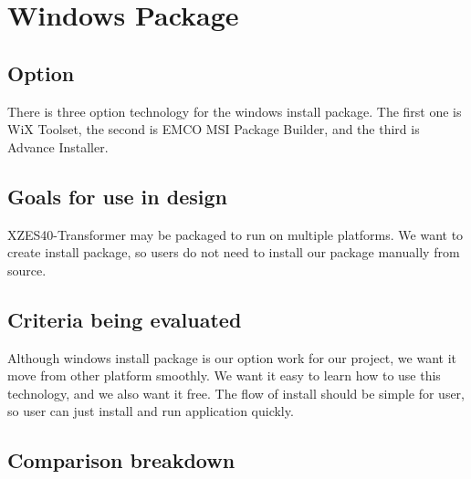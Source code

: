 \section{Windows Package}

\subsection{Option}

There is three option technology for the windows install package.
The first one is WiX Toolset, the second is EMCO MSI Package Builder, and the third is Advance Installer.

\subsection{Goals for use in design}

XZES40-Transformer may be packaged to run on multiple platforms.
We want to create install package, so users do not need to install our package manually from source.

\subsection{Criteria being evaluated}

Although windows install package is our option work for our project, we want it move from other platform smoothly.
We want it easy to learn how to use this technology, and we also want it free.
The flow of install should be simple for user, so user can just install and run application quickly.

\subsection{Comparison breakdown}

